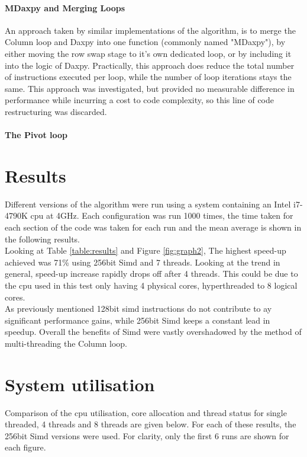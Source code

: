 \documentclass[conference]{acmsiggraph}
\begin{document}
\paragraph{MDaxpy and Merging Loops}
An approach taken by similar implementations of the algorithm, is to merge the Column loop and Daxpy into one function (commonly named "MDaxpy"), by either moving the row swap stage to it's own dedicated loop, or by including it into the logic of Daxpy. Practically, this approach does reduce the total number of instructions executed per loop, while the number of loop iterations stays the same. This approach was investigated, but provided no measurable difference in performance while incurring a cost to code complexity, so this line of code restructuring was discarded.

\paragraph{The Pivot loop}


\section{Results}
Different versions of the algorithm were run using a system containing an Intel i7-4790K cpu at 4GHz. Each configuration was run 1000 times, the time taken for each section of the code was taken for each run and the mean average is shown in the following results.\\
Looking at Table \ref{table:results} and Figure \ref{fig:graph2}, The highest speed-up achieved was 71\% using 256bit Simd and 7 threads. 
Looking at the trend in general, speed-up increase rapidly drops off after 4 threads. This could be due to the cpu used in this test only having 4 physical cores, hyperthreaded to 8 logical cores.\\
As previously mentioned 128bit simd instructions do not contribute to ay significant performance gains, while 256bit Simd keeps a constant lead in speedup. Overall the benefits of Simd were vastly overshadowed by the method of multi-threading the Column loop.

\section{System utilisation}
Comparison of the cpu utilisation, core allocation and thread status for single threaded, 4 threads and 8 threads are given below. For each of these results, the 256bit Simd versions were used. For clarity, only the first 6 runs are shown for each figure.
\end{document}
